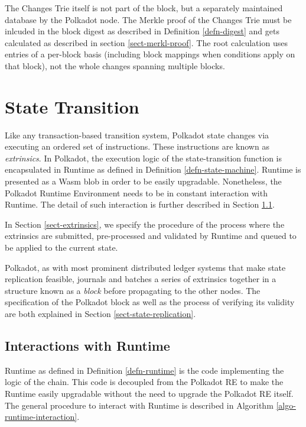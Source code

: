 \documentclass{book}
\newcommand{\tmem}[1]{{\em #1\/}}
\newcommand{\tmtextit}[1]{{\itshape{#1}}}
\providecommand{\tmem}[1]{\tmtextit{#1}}
\providecommand{\tmtextit}[1]{\tmtextit{#1}}
\begin{document}
The Changes Trie itself is not part of the block, but a separately maintained
database by the Polkadot node. The Merkle proof of the Changes Trie must be
inlcuded in the block digest as described in Definition \ref{defn-digest} and
gets calculated as described in section \ref{sect-merkl-proof}. The root
calculation uses entries of a per-block basis (including block mappings when
conditions apply on that block), not the whole changes spanning multiple
blocks.\chapter{State Transition}\label{chap-state-transit}

Like any transaction-based transition system, Polkadot state changes via
executing an ordered set of instructions. These instructions are known as
{\tmem{extrinsics}}. In Polkadot, the execution logic of the state-transition
function is encapsulated in Runtime as defined in Definition
\ref{defn-state-machine}. Runtime is presented as a Wasm blob in order to be
easily upgradable. Nonetheless, the Polk{\nobreak}adot Runtime Environment
needs to be in constant interaction with Runtime. The detail of such
interaction is further described in Section \ref{sect-entries-into-runtime}.

In Section \ref{sect-extrinsics}, we specify the procedure of the process
where the extrinsics are submitted, pre-processed and validated by Runtime and
queued to be applied to the current state.

Polkadot, as with most prominent distributed ledger systems that make state
replication feasible, journals and batches a series of extrinsics together in
a structure known as a {\tmem{block}} before propagating to the other nodes.
The specification of the Polkadot block as well as the process of verifying
its validity are both explained in Section \ref{sect-state-replication}.

\section{Interactions with Runtime}\label{sect-entries-into-runtime}

Runtime as defined in Definition \ref{defn-runtime} is the code implementing
the logic of the chain. This code is decoupled from the Polkadot RE to make
the Runtime easily upgradable without the need to upgrade the Polkadot RE
itself. The general procedure to interact with Runtime is described in
Algorithm \ref{algo-runtime-interaction}.
\end{document}

